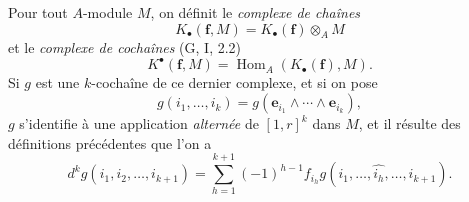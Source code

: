 \begin{env}[1.1.2]
\label{III.1.1.2-fr}
Pour tout $A$-module $M$, on définit le \emph{complexe de chaînes}
\begin{equation}
\label{III.1.1.2.1-fr}
\tag{1.1.2.1}
K_\bullet(\mathbf f,M)=K_\bullet(\mathbf f)\otimes_A M
\end{equation}
et le \emph{complexe de cochaînes} (G, I, 2.2)
\begin{equation}
\label{III.1.1.2.2-fr}
\tag{1.1.2.2}
K^\bullet(\mathbf f,M)=\operatorname{Hom}_A(K_\bullet(\mathbf f),M).
\end{equation}
Si $g$ est une $k$-cochaîne de ce dernier complexe, et si on pose
\[
g(i_1,\ldots,i_k)=g(\mathbf e_{i_1}\wedge\cdots\wedge\mathbf e_{i_k}),
\]
$g$ s'identifie à une application \emph{alternée} de $[1,r]^k$ dans $M$, et
il résulte des définitions précédentes que l'on a
\begin{equation}
\label{III.1.1.2.3-fr}
\tag{1.1.2.3}
d^kg(i_1,i_2,\ldots,i_{k+1})=
\sum_{h=1}^{k+1}(-1)^{h-1}f_{i_h}
g(i_1,\ldots,\widehat{i_h},\ldots,i_{k+1}).
\end{equation}
\end{env}

